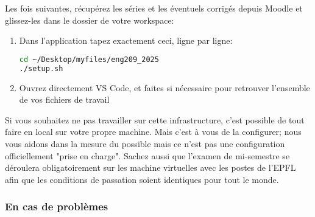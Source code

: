 \documentclass[10pt]{article}
\begin{document}
Les fois suivantes, récupérez les séries et les éventuels corrigés depuis Moodle et glissez-les dans le dossier de votre workspace:

\begin{enumerate}
\item Dans l'application  tapez exactement ceci, ligne par ligne:
\\
\begin{lstlisting}[language=Bash]
cd ~/Desktop/myfiles/eng209_2025
./setup.sh
\end{lstlisting}

\item Ouvrez directement VS Code, et faites  si nécessaire pour retrouver l'ensemble de vos fichiers de travail
\end{enumerate}

Si vous souhaitez ne pas travailler sur cette infrastructure, c'est possible de tout faire en local sur votre propre machine. Mais c'est à vous de la configurer; nous vous aidons dans la mesure du possible mais ce n'est pas une configuration officiellement "prise en charge". Sachez aussi que l'examen de mi-semestre se déroulera obligatoirement sur les machine virtuelles avec les postes de l'EPFL afin que les conditions de passation soient identiques pour tout le monde.

\subsubsection*{En cas de problèmes}
\end{document}

